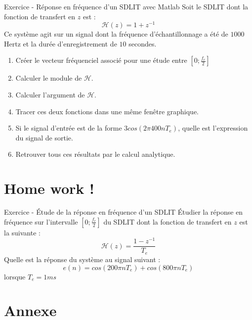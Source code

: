 \documentclass[a4paper,11pt]{beamer}
\newcounter{exampleBlockCounter}
\begin{document}
\begin{frame}
\begin{exampleblock}{Exercice  - Réponse
en fréquence d'un SDLIT avec Matlab}
\justifying
Soit le SDLIT dont la fonction de transfert en $z$ est :
$$
\mathcal{H}(z)=1+z^{-1}
$$
Ce système agit sur un signal dont la fréquence d'échantillonnage a été de
$1000$ Hertz et la durée d'enregistrement de $10$ secondes.
\begin{enumerate}
  \item Créer le vecteur fréquenciel associé pour une étude entre
  $[0;\frac{f_e}{2}]$
  \item Calculer le module de $\mathcal{H}$.
  \item Calculer l'argument de $\mathcal{H}$.
  \item Tracer ces deux fonctions dans une même fenêtre graphique.
  \item Si le signal d'entrée est de la forme $3cos(2\pi 400 nT_e)$, quelle est
  l'expression du signal de sortie.
  \item Retrouver tous ces résultats par le calcul analytique.
\end{enumerate}
\end{exampleblock}
\end{frame}

\section{Home work !}
\begin{frame}
\begin{exampleblock}{Exercice  - Étude de la réponse
en fréquence d'un SDLIT}
\justifying
Étudier la réponse en fréquence sur l'intervalle $[0;\frac{f_e}{2}]$ du SDLIT
dont la fonction de transfert en $z$ est la suivante :
$$
\mathcal{H}(z) = \frac{1-z^{-1}}{T_e}
$$
Quelle est la réponse du système au signal suivant :
$$
e(n) = cos(200\pi nT_e) + cos(800\pi nT_e)
$$
lorsque $T_e=1ms$
\end{exampleblock}
\end{frame}

\section{Annexe}
\end{document}
